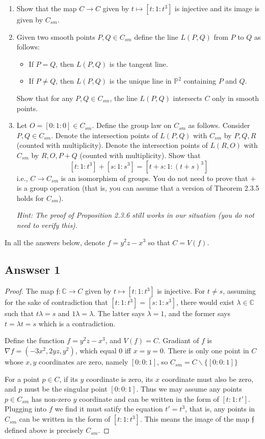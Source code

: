 \documentclass{article}
\theoremstyle{definition}
\theoremstyle{definition}
\theoremstyle{remark}
\newcommand{\bb}[1]{\mathbb{#1}} %
\begin{document}
\begin{enumerate}
    \item Show that the map $C \to C$ given by $t \mapsto [t : 1 : t^3]$ is injective and its image is given by $C_{sm}$.
    \item Given two smooth points $P,Q \in C_{sm}$ define the line $L(P,Q)$ from $P$ to $Q$ as follows:
    \begin{itemize}
        \item If $P = Q$, then $L(P,Q)$ is the tangent line.
        \item If $P \neq Q$, then $L(P,Q)$ is the unique line in $\mathbb{P}^2$ containing $P$ and $Q$.
    \end{itemize}
    Show that for any $P,Q \in C_{sm}$, the line $L(P,Q)$ intersects $C$ only in smooth points.
    \item Let $O = [0 : 1 : 0] \in C_{sm}$. Define the group law on $C_{sm}$ as follows. Consider $P,Q \in C_{sm}$. Denote the intersection points of $L(P,Q)$ with $C_{sm}$ by $P,Q,R$ (counted with multiplicity). Denote the intersection points of $L(R,O)$ with $C_{sm}$ by $R,O, P + Q$ (counted with multiplicity). Show that
    \[
    [t : 1 : t^3] + [s : 1 : s^3] = [t + s : 1 : (t + s)^3]
    \]
    i.e., $C \to C_{sm}$ is an isomorphism of groups. You do not need to prove that $+$ is a group operation (that is, you can assume that a version of Theorem 2.3.5 holds for $C_{sm}$).
    
    \textit{Hint: The proof of Proposition 2.3.6 still works in our situation (you do not need to verify this).}
\end{enumerate}

In all the answers below, denote $f = y^2z - x^3$ so that $C = V(f)$.

\subsection*{Answser 1}

\begin{proof}
	The map $\mathfrak{f} : \bb{C} \rightarrow C$ given by $t \mapsto [t:1:t^3]$ is injective.
	For $t \neq s$, assuming for the sake of contradiction that $[t:1:t^3] = [s:1:s^3]$, there would exist $\lambda \in \bb{C}$ such that $t \lambda = s$ and $1 \lambda = \lambda$. 
	The latter says $\lambda =1$, and the former says $t = \lambda t = s$ which is a contradiction. 

	Define the function $f = y^2 z - x^3$, and $V(f) = C$. 
	Gradiant of $f$ is $\nabla f = (-3x^2, 2yz, y^2)$, which equal 0 iff $x = y = 0$. 
	There is only one point in $C$ whose $x,y$ coordinates are zero, namely $[0:0:1]$, so $C_{sm} = C \smallsetminus \{[0:0:1]\}$

	For a point $p \in C$, if its $y$ coordinate is zero, its $x$ coordinate must also be zero, and $p$ must be the singular point $[0:0:1]$. 
	Thus we may assume any points $p \in C_{sm}$ has non-zero $y$ coordinate and can be written in the form of $[t: 1: t']$. 
	Plugging into $f$ we find it must satify the equation $t' = t ^3$, that is, any points in $C_{sm}$ can be written in the form of $[t: 1: t^3]$.
	This means the image of the map $\mathfrak{f}$ defined above is precisely $C_{sm}$.
\end{proof}
\end{document}
